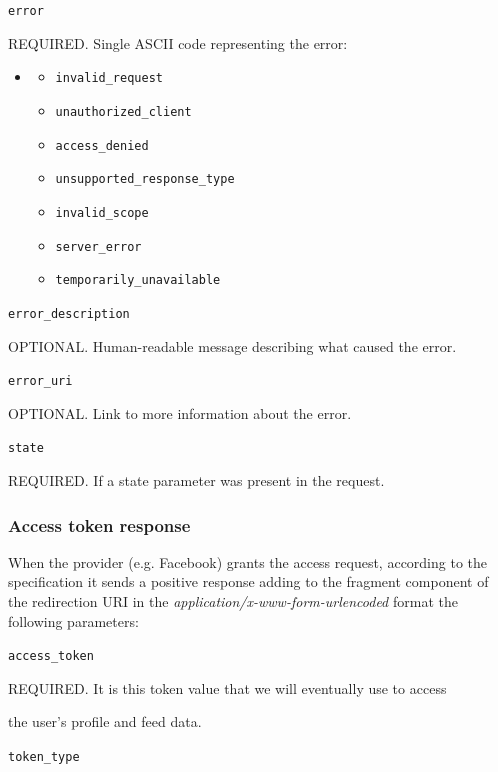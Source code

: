 \texttt{error}

\hspace{0.5cm}REQUIRED. Single ASCII code representing the error:

\begin{itemize}
\item[] \begin{itemize}
        \item \texttt{invalid\_request}
        \item \texttt{unauthorized\_client}
        \item \texttt{access\_denied}
        \item \texttt{unsupported\_response\_type}
        \item \texttt{invalid\_scope}
        \item \texttt{server\_error}
        \item \texttt{temporarily\_unavailable}
\end{itemize}
\end{itemize}

\texttt{error\_description}

\hspace{0.5cm}OPTIONAL. Human-readable message describing what caused the error.

\texttt{error\_uri}

\hspace{0.5cm}OPTIONAL. Link to more information about the error.

\texttt{state}

\hspace{0.5cm}REQUIRED. If a state parameter was present in the request.

\subsubsection{Access token response}
When the provider (e.g. Facebook) grants the access request, according to the specification it sends a positive response adding to the fragment component of the redirection URI in the \textit{application/x-www-form-urlencoded} format the following parameters:

\texttt{access\_token}

\hspace{0.5cm}REQUIRED. It is this token value that we will eventually use to access

\hspace{0.5cm}the user's profile and feed data.

\texttt{token\_type}

